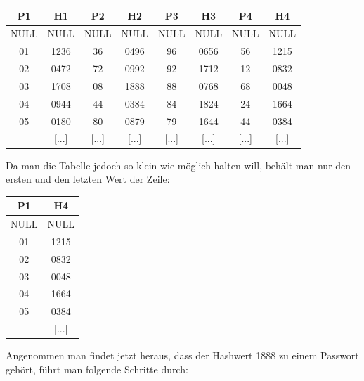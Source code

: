 \documentclass[a4paper, 11pt, nofootinbib]{article}
\begin{document}
\begin{center}
\begin{tabular}{|c|c|c|c|c|c|c|c|}
	\hline 
	P1 & H1 & P2 & H2 & P3 & H3 & P4 & H4\\ 
	\hline  
	NULL & NULL &  NULL & NULL & NULL & NULL & NULL & NULL \\ 
	\hline 
	01 & 1236 & 36 & 0496 & 96 & 0656 & 56 & 1215 \\ 
	\hline 
	02 & 0472 & 72 & 0992 & 92 & 1712 & 12 & 0832 \\ 
	\hline 
	03 & 1708 & 08 & 1888 & 88 & 0768 & 68 & 0048 \\ 
	\hline 
	04 & 0944 & 44 & 0384 & 84 & 1824 & 24 & 1664 \\ 
	\hline 
	05 & 0180 & 80 & 0879 & 79 & 1644 & 44 & 0384 \\ 
	\hline 
	[...]& [...] & [...]& [...] &[...]& [...] &[...]& [...]\\ 
	\hline  
\end{tabular} 
\end{center}

Da man die Tabelle jedoch so klein wie möglich halten will, behält man nur den ersten und den letzten Wert der Zeile:

\begin{center}
	\begin{tabular}{|c|c|}
		\hline 
		P1 & H4\\ 
		\hline  
		NULL & NULL \\ 
		\hline 
		01 & 1215 \\ 
		\hline 
		02 & 0832 \\ 
		\hline 
		03 & 0048 \\ 
		\hline 
		04 & 1664 \\ 
		\hline 
		05 & 0384 \\ 
		\hline
		[...]& [...]\\
		\hline
	\end{tabular} 
\end{center}

Angenommen man findet jetzt heraus, dass der Hashwert 1888 zu einem Passwort gehört, führt man folgende Schritte durch:
\end{document}
